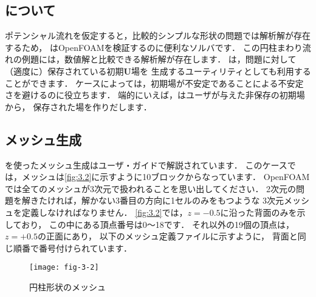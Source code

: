 \subsection{について}
\label{ssec:3.1.2}
ポテンシャル流れを仮定すると，比較的シンプルな形状の問題では解析解が存在するため，
はOpenFOAMを検証するのに便利なソルバです．
この円柱まわり流れの例題には，数値解と比較できる解析解が存在します．
は，問題に対して（適度に）保存されている初期$\bm{U}$場を
生成するユーティリティとしても利用することができます．
ケースによっては，初期場が不安定であることによる不安定さを避けるのに役立ちます．
端的にいえば，はユーザが与えた非保存の初期場から，
保存された場を作りだします．


\subsection{メッシュ生成}
\label{ssec:3.1.3}
を使ったメッシュ生成はユーザ・ガイドで解説されています．
このケースでは，メッシュは\autoref{fig:3.2}に示すように10ブロックからなっています．
OpenFOAMでは全てのメッシュが3次元で扱われることを思い出してください．
2次元の問題を解きたければ，解かない3番目の方向に1セルのみをもつような
3次元メッシュを定義しなければなりません．
\autoref{fig:3.2}では，$z = -0.5$に沿った背面のみを示しており，
この中にある頂点番号は0〜18です．
それ以外の19個の頂点は，$z = +0.5$の正面にあり，
以下のメッシュ定義ファイルに示すように，
背面と同じ順番で番号付けられています．


\begin{figure}[b]
 \texttt{[image: fig-3-2]}
 \caption{円柱形状のメッシュ}
 \label{fig:3.2}
\end{figure}


